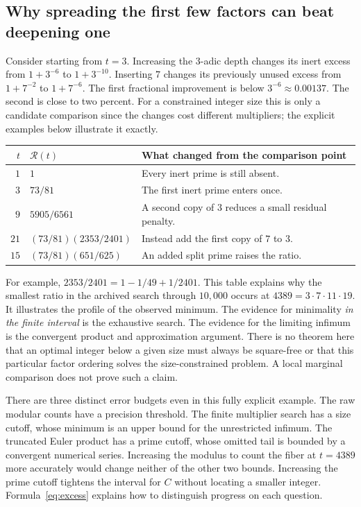 \documentclass[12pt,letterpaper]{article}
\begin{document}
\subsection{Why spreading the first few factors can beat deepening one}
Consider starting from $t=3$. Increasing the $3$-adic depth changes its inert excess from $1+3^{-6}$ to $1+3^{-10}$. Inserting $7$ changes its previously unused excess from $1+7^{-2}$ to $1+7^{-6}$. The first fractional improvement is below $3^{-6}\approx0.00137$. The second is close to two percent. For a constrained integer size this is only a candidate comparison since the changes cost different multipliers; the explicit examples below illustrate it exactly.
\begin{center}\small
\begin{tabularx}{\linewidth}{@{}rlY@{}}\toprule
$t$ & $\mathcal R(t)$ & What changed from the comparison point\\\midrule
$1$ & $1$ & Every inert prime is still absent.\\
$3$ & $73/81$ & The first inert prime enters once.\\
$9$ & $5905/6561$ & A second copy of $3$ reduces a small residual penalty.\\
$21$ & $(73/81)(2353/2401)$ & Instead add the first copy of $7$ to $3$.\\
$15$ & $(73/81)(651/625)$ & An added split prime raises the ratio.\\
\bottomrule\end{tabularx}
\end{center}
For example, $2353/2401=1-1/49+1/2401$. This table explains why the smallest ratio in the archived search through $10{,}000$ occurs at $4389=3\cdot7\cdot11\cdot19$. It illustrates the profile of the observed minimum. The evidence for minimality \emph{in the finite interval} is the exhaustive search. The evidence for the limiting infimum is the convergent product and approximation argument. There is no theorem here that an optimal integer below a given size must always be square-free or that this particular factor ordering solves the size-constrained problem. A local marginal comparison does not prove such a claim.

There are three distinct error budgets even in this fully explicit example. The raw modular counts have a precision threshold. The finite multiplier search has a size cutoff, whose minimum is an upper bound for the unrestricted infimum. The truncated Euler product has a prime cutoff, whose omitted tail is bounded by a convergent numerical series. Increasing the modulus to count the fiber at $t=4389$ more accurately would change neither of the other two bounds. Increasing the prime cutoff tightens the interval for $C$ without locating a smaller integer. Formula~\eqref{eq:excess} explains how to distinguish progress on each question.
\end{document}
